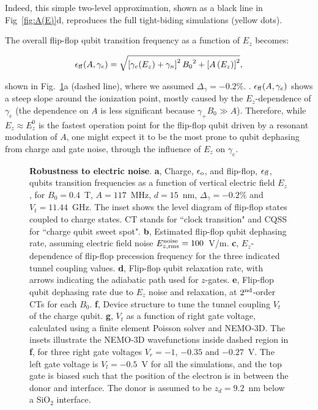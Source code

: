 \documentclass[aps,prb,superscriptaddress,nobibnotes,twocolumn]{revtex4-1}
\begin{document}
Indeed, this simple two-level approximation, shown as a black line in Fig~\ref{fig:A(E)}d, reproduces the full tight-biding simulations (yellow dots).

The overall flip-flop qubit transition frequency as a function of $E_z$ becomes:

\begin{equation} \label{eq:e_ff_ge}
\epsilon_{\rm ff}(A,\gamma_e)=\sqrt{\left[\gamma_e(E_z)+\gamma_n\right]^2{B_0}^2+\left[A\left(E_z\right)\right]^2},
\end{equation}

shown in Fig.~\ref{fig:clock}a (dashed line), where we assumed $\Delta_\gamma=-0.2\%$. \cite{Rahman2009a}. $\epsilon_{\rm ff}(A,\gamma_e)$ shows a steep slope around the ionization point, mostly caused by the $E_z$-dependence of $\gamma_e$ (the dependence on $A$ is less significant because $\gamma_+B_0\gg A$). Therefore, while $E_z\approx E_z^0$ is the fastest operation point for the flip-flop qubit driven by a resonant modulation of $A$, one might expect it to be the most prone to qubit dephasing from charge and gate noise, through the influence of $E_z$ on $\gamma_e$.


\begin{figure}
	\centering
	\caption{\textbf{Robustness to electric noise}.
		\textbf{a}, Charge, $\epsilon_{\rm o}$, and flip-flop, $\epsilon_{\rm ff}$, qubits transition frequencies as a function of vertical electric field $E_z$, for $B_0=0.4$~T, $A=117$~MHz, $d=15$~nm, $\Delta_\gamma=-0.2\%$ and $V_t=11.44$~GHz. The inset shows the level diagram of flip-flop states coupled to charge states. CT stands for ``clock transition" and CQSS for ``charge qubit sweet spot".
		\textbf{b}, Estimated flip-flop qubit dephasing rate, assuming electric field noise $E_{z, \rm rms}^{\rm noise}=100$~V/m.
		\textbf{c}, $E_z$-dependence of flip-flop precession frequency for the three indicated tunnel coupling values.
		\textbf{d}, Flip-flop qubit relaxation rate, with arrows indicating the adiabatic path used for $z$-gates.
		\textbf{e}, Flip-flop qubit dephasing rate due to $E_z$ noise and relaxation, at $2^{\rm nd}$-order CTs for each $B_0$.
		\textbf{f}, Device structure to tune the tunnel coupling $V_t$ of the charge qubit. 
		\textbf{g}, $V_t$ as a function of right gate voltage, calculated using a finite element Poisson solver \cite{Note1} and NEMO-3D. The insets illustrate the NEMO-3D wavefunctions inside dashed region in \textbf{f}, for three right gate voltages $V_r=-1$, $-0.35$ and $-0.27$~V. The left gate voltage is $V_l=-0.5$~V for all the simulations, and the top gate is biased such that the position of the electron is in between the donor and interface. The donor is assumed to be $z_d=9.2$~nm below a SiO$_2$ interface.}
\label{fig:clock}
\end{figure}
\end{document}
